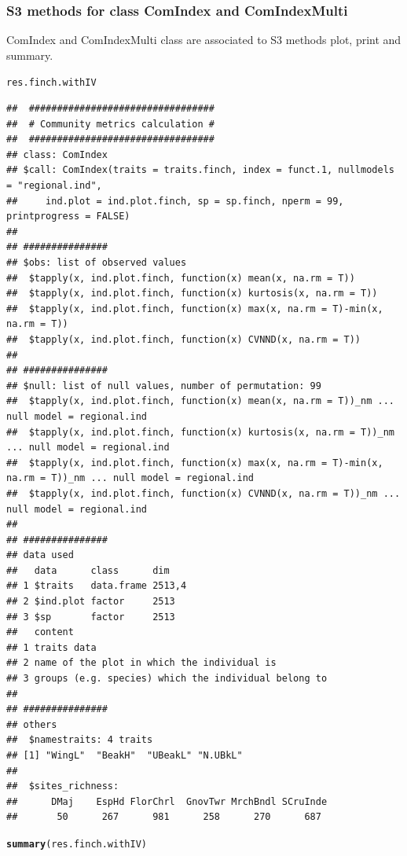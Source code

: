 \documentclass[12pt]{article}\usepackage[]{graphicx}\usepackage[]{color}
\makeatletter
\newcommand{\hlstd}[1]{\textcolor[rgb]{0.345,0.345,0.345}{#1}}%
\newcommand{\hlkwd}[1]{\textcolor[rgb]{0.737,0.353,0.396}{\textbf{#1}}}%
\newenvironment{kframe}{%
 \def\at@end@of@kframe{}%
 \ifinner\ifhmode%
  \def\at@end@of@kframe{\end{minipage}}%
  \begin{minipage}{\columnwidth}%
 \fi\fi%
 \def\FrameCommand##1{\hskip\@totalleftmargin \hskip-\fboxsep
 \colorbox{shadecolor}{##1}\hskip-\fboxsep
     \hskip-\linewidth \hskip-\@totalleftmargin \hskip\columnwidth}%
 \MakeFramed {\advance\hsize-\width
   \@totalleftmargin\z@ \linewidth\hsize
   \@setminipage}}%
 {\par\unskip\endMakeFramed%
 \at@end@of@kframe}
\newenvironment{knitrout}{}{} %
\makeatother
\begin{document}
\subsubsection{S3 methods for class ComIndex and ComIndexMulti}
ComIndex and ComIndexMulti class are associated to S3 methods plot, print and summary.

\begin{knitrout}
\color{fgcolor}\begin{kframe}
\begin{alltt}
\hlstd{res.finch.withIV}
\end{alltt}
\begin{verbatim}
## 	#################################
## 	# Community metrics calculation #
## 	#################################
## class: ComIndex
## $call: ComIndex(traits = traits.finch, index = funct.1, nullmodels = "regional.ind", 
##     ind.plot = ind.plot.finch, sp = sp.finch, nperm = 99, printprogress = FALSE)
## 
## ###############
## $obs: list of observed values
## 	$tapply(x, ind.plot.finch, function(x) mean(x, na.rm = T))
## 	$tapply(x, ind.plot.finch, function(x) kurtosis(x, na.rm = T))
## 	$tapply(x, ind.plot.finch, function(x) max(x, na.rm = T)-min(x, na.rm = T))
## 	$tapply(x, ind.plot.finch, function(x) CVNND(x, na.rm = T))
## 
## ###############
## $null: list of null values, number of permutation: 99 
## 	$tapply(x, ind.plot.finch, function(x) mean(x, na.rm = T))_nm ... null model = regional.ind
## 	$tapply(x, ind.plot.finch, function(x) kurtosis(x, na.rm = T))_nm ... null model = regional.ind
## 	$tapply(x, ind.plot.finch, function(x) max(x, na.rm = T)-min(x, na.rm = T))_nm ... null model = regional.ind
## 	$tapply(x, ind.plot.finch, function(x) CVNND(x, na.rm = T))_nm ... null model = regional.ind
## 
## ###############
## data used
##   data      class      dim   
## 1 $traits   data.frame 2513,4
## 2 $ind.plot factor     2513  
## 3 $sp       factor     2513  
##   content                                             
## 1 traits data                                         
## 2 name of the plot in which the individual is         
## 3 groups (e.g. species) which the individual belong to
## 
## ###############
## others
## 	$namestraits: 4 traits
## [1] "WingL"  "BeakH"  "UBeakL" "N.UBkL"
## 
## 	$sites_richness:
## 	    DMaj    EspHd FlorChrl  GnovTwr MrchBndl SCruInde 
##       50      267      981      258      270      687
\end{verbatim}
\begin{alltt}
\hlkwd{summary}\hlstd{(res.finch.withIV)}

\end{alltt}
\end{kframe}
\end{knitrout}
\end{document}
